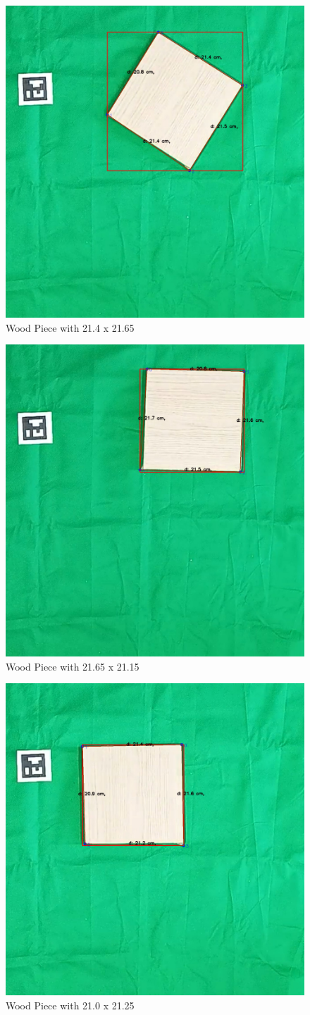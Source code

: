 \begin{figure}[!h]
    \centering
    \includegraphics[width=0.35\linewidth]{images/Normal Dist/21.2x21_10.png}
    \caption{Wood Piece with 21.4 x 21.65}
    \label{fig:enter-label}
\end{figure}


\begin{figure}[!h]
    \centering
    \includegraphics[width=0.35\linewidth]{images/Normal Dist/21.2x21_11.png}
    \caption{Wood Piece with 21.65 x 21.15}
    \label{fig:enter-label}
\end{figure}


\begin{figure}[!h]
    \centering
    \includegraphics[width=0.35\linewidth]{images/Normal Dist/21.2x21_12.png}
    \caption{Wood Piece with 21.0 x 21.25}
    \label{fig:enter-label}
\end{figure}